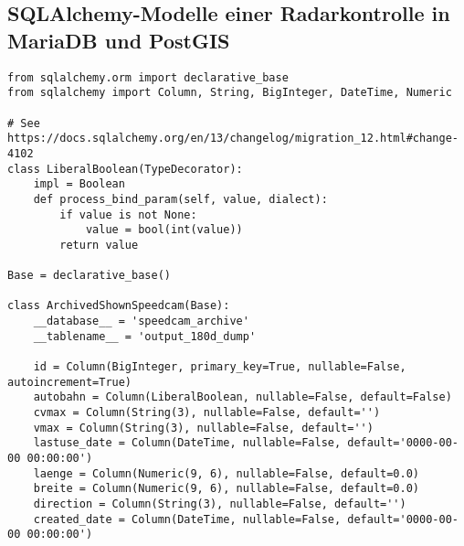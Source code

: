 \subsection{SQLAlchemy-Modelle einer Radarkontrolle in MariaDB und PostGIS}
\label{sec:SQLAlchemyModels}

\begin{code}
\begin{verbatim}
from sqlalchemy.orm import declarative_base
from sqlalchemy import Column, String, BigInteger, DateTime, Numeric

# See https://docs.sqlalchemy.org/en/13/changelog/migration_12.html#change-4102
class LiberalBoolean(TypeDecorator):
    impl = Boolean
    def process_bind_param(self, value, dialect):
        if value is not None:
            value = bool(int(value))
        return value

Base = declarative_base()

class ArchivedShownSpeedcam(Base):
    __database__ = 'speedcam_archive'
    __tablename__ = 'output_180d_dump'

    id = Column(BigInteger, primary_key=True, nullable=False, autoincrement=True)
    autobahn = Column(LiberalBoolean, nullable=False, default=False)
    cvmax = Column(String(3), nullable=False, default='')
    vmax = Column(String(3), nullable=False, default='')
    lastuse_date = Column(DateTime, nullable=False, default='0000-00-00 00:00:00')
    laenge = Column(Numeric(9, 6), nullable=False, default=0.0)
    breite = Column(Numeric(9, 6), nullable=False, default=0.0)
    direction = Column(String(3), nullable=False, default='')
    created_date = Column(DateTime, nullable=False, default='0000-00-00 00:00:00')
\end{verbatim}
\label{lst:SQLAlchemyModelMariaDB}
\end{code}



